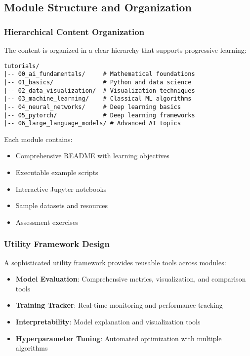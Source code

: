 \subsection{Module Structure and Organization}

\subsubsection{Hierarchical Content Organization}

The content is organized in a clear hierarchy that supports progressive learning:

\begin{verbatim}
tutorials/
|-- 00_ai_fundamentals/     # Mathematical foundations
|-- 01_basics/              # Python and data science
|-- 02_data_visualization/  # Visualization techniques
|-- 03_machine_learning/    # Classical ML algorithms
|-- 04_neural_networks/     # Deep learning basics
|-- 05_pytorch/             # Deep learning frameworks
|-- 06_large_language_models/ # Advanced AI topics
\end{verbatim}

Each module contains:
\begin{itemize}
    \item Comprehensive README with learning objectives
    \item Executable example scripts
    \item Interactive Jupyter notebooks
    \item Sample datasets and resources
    \item Assessment exercises
\end{itemize}

\subsubsection{Utility Framework Design}

A sophisticated utility framework provides reusable tools across modules:

\begin{itemize}
    \item \textbf{Model Evaluation}: Comprehensive metrics, visualization, and comparison tools
    \item \textbf{Training Tracker}: Real-time monitoring and performance tracking
    \item \textbf{Interpretability}: Model explanation and visualization tools
    \item \textbf{Hyperparameter Tuning}: Automated optimization with multiple algorithms
\end{itemize}

